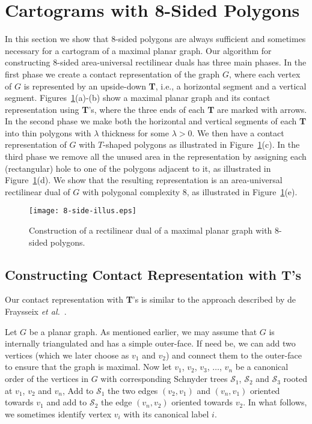 \documentclass[11pt]{article}
\begin{document}
\section{Cartograms with 8-Sided Polygons}
\label{sec:eight-side}



In this section we show that 8-sided polygons are always sufficient and sometimes necessary for a
 cartogram of a maximal planar graph.
Our algorithm for constructing 8-sided area-universal rectilinear duals has
three
main phases. In the first phase we create a contact
 representation of the graph $G$, where each vertex of $G$ is represented by
an upside-down \textbf{T}, i.e., a horizontal segment
 and a vertical segment.
 Figures~\ref{fig:8-side-illus}(a)-(b) show a maximal planar graph and
 its contact representation using \textbf{T}'s, where the three ends of each \textbf{T} are marked
with arrows. In the second phase we make both the
horizontal and vertical segments of each \textbf{T} into thin polygons
with $\lambda$ thickness for some $\lambda >0$. We then have a contact
 representation of $G$ with $T$-shaped polygons as illustrated in
 Figure~\ref{fig:8-side-illus}(c). In the third phase
 we remove all the unused area in the representation by assigning each
 (rectangular) hole to one of the polygons adjacent to it, as
 illustrated in Figure~\ref{fig:8-side-illus}(d). We show that the
 resulting representation is an area-universal rectilinear dual of $G$
 with polygonal complexity 8, as illustrated in Figure~\ref{fig:8-side-illus}(e).


\begin{figure}[htbp]
\centering
\texttt{[image: 8-side-illus.eps]}
\caption{\small\sf Construction of a rectilinear dual of a maximal planar graph with 8-sided polygons.}
\label{fig:8-side-illus}
\end{figure}



\subsection{Constructing Contact Representation with \textbf{T}'s}

Our contact representation with \textbf{T}'s is similar to the
approach described by de Fraysseix \textit{et al.}~\cite{FMR04}.


Let $G$ be a planar graph.  As mentioned earlier, we may assume
that $G$ is internally triangulated and has a simple outer-face.
If need be, we can add two vertices (which we later choose as $v_1$ and
$v_2$) and connect them to the outer-face to ensure that the graph is maximal. Now let $v_1$, $v_2$, $v_3$, $\ldots$, $v_n$ be a canonical order of the
 vertices in $G$ with corresponding Schnyder trees $\mathcal{S}_1$,
 $\mathcal{S}_2$ and $\mathcal{S}_3$ rooted at $v_1$, $v_2$ and $v_n$,
 Add to $\mathcal{S}_1$ the
 two edges $(v_2, v_1)$ and $(v_n, v_1)$ oriented towards $v_1$ and add to $\mathcal{S}_2$ the edge $(v_n, v_2)$
 oriented towards $v_2$.
In what follows, we sometimes identify vertex $v_i$ with its canonical
label $i$.
\end{document}
